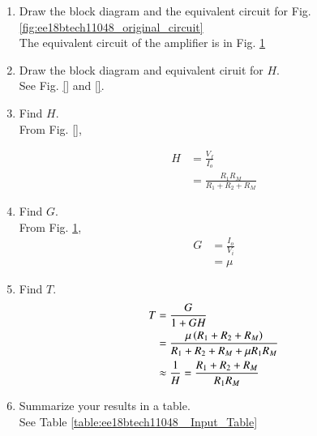 \begin{enumerate}[label=\arabic*.,ref=\theenumi]

\item Draw the block diagram and the equivalent circuit for Fig. \ref{fig:ee18btech11048_original_circuit}\\
\solution
The equivalent circuit of the amplifier is in Fig. \ref{fig:ee18btech11048_ss_circuit}

\begin{figure}[!ht]
	\begin{center}
		\resizebox{\columnwidth}{!}{}
	\end{center}
\caption{}
\label{fig:ee18btech11048_ss_circuit}
\end{figure}


\item Draw the block diagram and equivalent ciruit for $H$.
\\
\solution See Fig. \ref{} and \ref{}.
\item Find  $H$.
\\
\solution From Fig. \ref{},

\begin{align}
H &= \frac{V_{f}}{I_{o}} 
\\
&= \frac{R_1R_M}{R_1+R_2+R_M}
\label{eq:ee18btech11048_H}
\end{align}
%
\item Find  $G$.
\\
\solution From Fig. \ref{fig:ee18btech11048_ss_circuit},
\begin{align}
G &= \frac{I_{o}}{V_{i}} \label{eq:ee18btech11048_G}\\
&= \mu
\end{align}
\item  Find $T$.
\\
\solution
\begin{align}
T &= \frac{G}{1+GH} \label{eq:ee18btech11048_T}
\\
&= \frac{\mu \left(R_1+R_2+R_M\right)}{R_1+R_2+R_M+ \mu R_1R_M}
\\
 &\approx \frac{1}{H}  = \frac{R_1+R_2+R_M}{R_1R_M} 
\end{align}

\item Summarize your results in a table.
\\
\solution See Table \ref{table:ee18btech11048_ Input_Table}



\end{enumerate}
